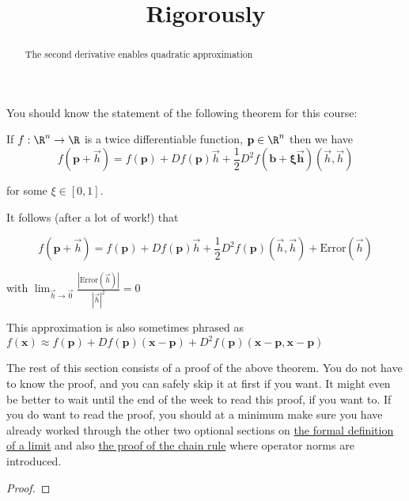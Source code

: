 \documentclass{ximera}
\title{Rigorously}
\begin{document}
	\begin{abstract}
		The second derivative enables quadratic approximation
	\end{abstract}
	
	You should know the statement of the following theorem for this course:
	
	\begin{theorem}
		If $f:\R^n \to \R$ is a twice differentiable function, $\mathbf{p} \in \R^n$ then we have
		\[
			f(\mathbf{p} + \vec{h}) = f(\mathbf{p})+ Df(\mathbf{p})\vec{h}+\frac{1}{2}D^2f(\mathbf{b+\xi\vec{h}})(\vec{h},\vec{h})
		\]
		
		for some $\xi \in [0,1]$.
		
		It follows (after a lot of work!) that
		
		\[
			f(\mathbf{p} + \vec{h}) = f(\mathbf{p})+ Df(\mathbf{p})\vec{h}+\frac{1}{2}D^2f(\mathbf{p})(\vec{h},\vec{h})+ \textrm{Error}(\vec{h})
		\]
		
		with $\displaystyle\lim_{\vec{h} \to \vec{0}} \frac{|\textrm{Error}(\vec{h})|}{|\vec{h}|^2} = 0$
	\end{theorem}
	
	This approximation is also sometimes phrased as 
	$f(\mathbf{x}) \approx f(\mathbf{p}) + Df(\mathbf{p})(\mathbf{x}-\mathbf{p})+D^2f(\mathbf{p})(\mathbf{x}-\mathbf{p},\mathbf{x}-\mathbf{p})$
	
	The rest of this section consists of a proof of the above theorem.  You do not have to know the proof, and you can safely skip it at first if you want.  
	It might even be better to wait until
	the end of the week to read this proof, if you want to.  If you do want to read the proof, you should at a minimum make sure you have already worked through 
	the other two optional sections on \href{http://ximera.osu.edu/course/kisonecat/m2o2c2/course/activity/week2/limits/formal-limit/}{the formal definition of a limit} 
	and also \href{http://ximera.osu.edu/course/kisonecat/m2o2c2/course/activity/week2/chain-rule/proof/}{ the proof of the chain rule} where operator norms are introduced.
	
	\begin{proof}
	\end{proof}
	
	
	
	
	
\end{document}
